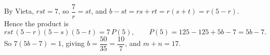 By Vieta, $rst=7$, so $\dfrac7r=st$, and $b-st=rs+rt=r(s+t)=r(5-r)$. Hence the product is
\[rst\,(5-r)(5-s)(5-t)=7\,P(5),\qquad P(5)=125-125+5b-7=5b-7.\]
So $7(5b-7)=1$, giving $b=\dfrac{50}{35}=\dfrac{10}7$, and $m+n=\boxed{17}$.
